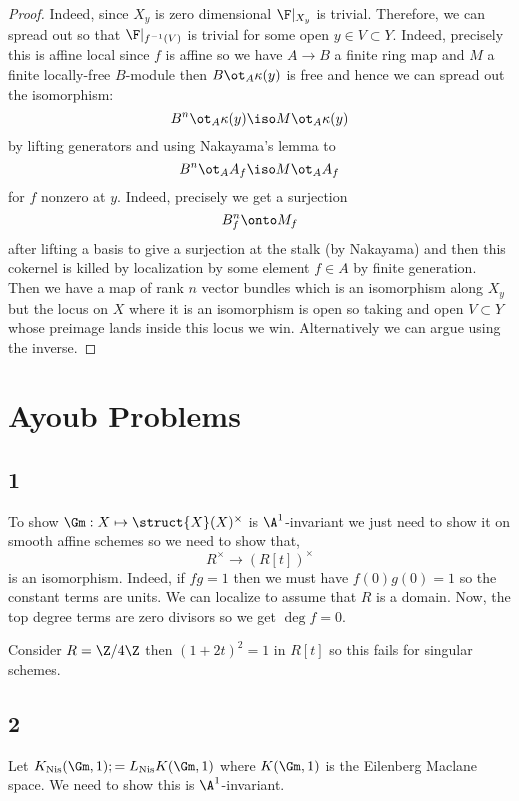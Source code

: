 \documentclass{article}
\newcommand{\Nis}{\mathrm{Nis}}
\begin{document}
\begin{proof}
Indeed, since $X_y$ is zero dimensional $\F|_{X_y}$ is trivial. Therefore, we can spread out so that $\F|_{f^{-1}(V)}$ is trivial for some open $y \in V \subset Y$. Indeed, precisely this is affine local since $f$ is affine so we have $A \to B$ a finite ring map and $M$ a finite locally-free $B$-module then $B \ot_A \kappa(y)$ is free and hence we can spread out the isomorphism:
\[ B^n \ot_A \kappa(y) \iso M \ot_A \kappa(y) \]
by lifting generators and using Nakayama's lemma to 
\[ B^n \ot_A A_f \iso M \ot_A A_f \]
for $f$ nonzero at $y$. Indeed, precisely we get a surjection
\[ B^n_f \onto M_f \]
after lifting a basis to give a surjection at the stalk (by Nakayama) and then this cokernel is killed by localization by some element $f \in A$ by finite generation. Then we have a map of rank $n$ vector bundles which is an isomorphism along $X_y$ but the locus on $X$ where it is an isomorphism is open so taking and open $V \subset Y$ whose preimage lands inside this locus we win. Alternatively we can argue using the inverse.  
\end{proof}

\section{Ayoub Problems}

\newcommand{\mot}{\mathrm{mot}}

\subsection{1}

To show $\Gm : X \mapsto \struct{X}(X)^\times$ is $\A^1$-invariant we just need to show it on smooth affine schemes so we need to show that,
\[ R^\times \to (R[t])^\times \]
is an isomorphism. Indeed, if $f g = 1$ then we must have $f(0) g(0) = 1$ so the constant terms are units. We can localize to assume that $R$ is a domain. Now, the top degree terms are zero divisors so we get $\deg{f} = 0$. 

\begin{rmk}
Consider $R = \Z / 4 \Z$ then $(1 + 2 t)^2 = 1$ in $R[t]$ so this fails for singular schemes. 
\end{rmk}

\subsection{2}

Let $K_{\Nis}(\Gm, 1) ;= L_{\Nis} K(\Gm, 1)$ where $K(\Gm, 1)$ is the Eilenberg Maclane space. We need to show this is $\A^1$-invariant. 
\end{document}
